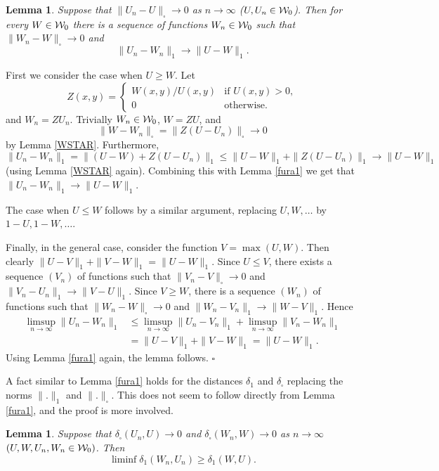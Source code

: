 \documentclass{article}
\newtheorem{lemma}[theorem]{Lemma}
\newenvironment{proof}{\medskip\noindent{\bf Proof. }}{\hfill$\square$\medskip}
\begin{document}
\begin{lemma}\label{REV-CONV-1}
Suppose that $\|U_n-U\|_\square\to 0$ as $n\to\infty$
($U,U_n\in\mathcal{W}_0$). Then for every $W\in\mathcal{W}_0$ there is a sequence of
functions $W_n\in \mathcal{W}_0$ such that $\|W_n-W\|_\square\to 0$ and
\[
\|U_n-W_n\|_1 \to \|U-W\|_1.
\]
\end{lemma}

\begin{proof}
First we consider the case when $U\ge W$. Let
\[
Z(x,y)=
  \begin{cases}
   W(x,y)/U(x,y)  & \text{if $U(x,y)>0$}, \\
    0 & \text{otherwise}.
  \end{cases}
\]
and $W_n=Z U_n$. Trivially $W_n\in\mathcal{W}_0$, $W=ZU$, and
\[
\|W-W_n\|_\square = \|Z(U-U_n)\|_\square \to 0
\]
by Lemma \ref{WSTAR}. Furthermore,
\[
\|U_n-W_n\|_1 = \|(U-W) + Z(U-U_n)\|_1 \le \|U-W\|_1 +
\|Z(U-U_n)\|_1\to \|U-W\|_1
\]
(using Lemma \ref{WSTAR} again). Combining this with Lemma
\ref{fura1} we get that $\|U_n-W_n\|_1 \to \|U-W\|_1$.

The case when $U\le W$ follows by a similar argument, replacing
$U,W,\dots$ by $1-U, 1-W,\dots$.

Finally, in the general case, consider the function $V=\max(U,W)$.
Then clearly $\|U-V\|_1+\|V-W\|_1 = \|U-W\|_1$. Since $U\le V$, there
exists a sequence $(V_n)$ of functions such that
$\|V_n-V\|_\square\to 0$ and $\|V_n-U_n\|_1\to \|V-U\|_1$. Since
$V\ge W$, there is a sequence $(W_n)$ of functions such that
$\|W_n-W\|_\square\to 0$ and $\|W_n-V_n\|_1\to \|W-V\|_1$. Hence
\begin{align*}
\limsup_{n\to\infty} \|U_n-W_n\|_1 &\le\limsup_{n\to\infty}
\|U_n-V_n\|_1 +\limsup_{n\to\infty} \|V_n-W_n\|_1 \\
&= \|U-V\|_1 + \|V-W\|_1 = \|U-W\|_1.
\end{align*}
Using Lemma \ref{fura1} again, the lemma follows.
\end{proof}

A fact similar to Lemma \ref{fura1} holds for the distances
$\delta_1$ and $\delta_\square$ replacing the norms $\|.\|_1$ and
$\|.\|_\square$. This does not seem to follow directly from Lemma
\ref{fura1}, and the proof is more involved.

\begin{lemma}\label{fura}
Suppose that $\delta_\square(U_n,U)\to 0$ and
$\delta_\square(W_n,W)\to 0$ as $n\to\infty$ $(U,W,U_n,W_n\in\mathcal{W}_0)$.
Then
\begin{equation}\label{EQ:SQU1}
\liminf \delta_1(W_n,U_n)\ge \delta_1(W,U).
\end{equation}
\end{lemma}
\end{document}
